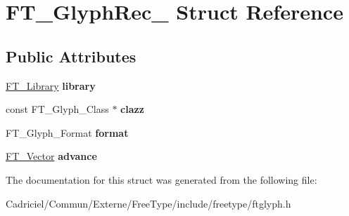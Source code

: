 \hypertarget{struct_f_t___glyph_rec__}{\section{F\-T\-\_\-\-Glyph\-Rec\-\_\- Struct Reference}
\label{struct_f_t___glyph_rec__}
}
\subsection*{Public Attributes}
\begin{DoxyCompactItemize}
\item 
\hypertarget{struct_f_t___glyph_rec___a00679b5e2519affab0f3999718817f8e}{\hyperlink{struct_f_t___library_rec__}{F\-T\-\_\-\-Library} {\bfseries library}}\label{struct_f_t___glyph_rec___a00679b5e2519affab0f3999718817f8e}

\item 
\hypertarget{struct_f_t___glyph_rec___ad7074cfe0e9fd6616e4dc4011e481524}{const F\-T\-\_\-\-Glyph\-\_\-\-Class $\ast$ {\bfseries clazz}}\label{struct_f_t___glyph_rec___ad7074cfe0e9fd6616e4dc4011e481524}

\item 
\hypertarget{struct_f_t___glyph_rec___a26b42a2610a69dcaed3e7c8b6d506211}{F\-T\-\_\-\-Glyph\-\_\-\-Format {\bfseries format}}\label{struct_f_t___glyph_rec___a26b42a2610a69dcaed3e7c8b6d506211}

\item 
\hypertarget{struct_f_t___glyph_rec___afd95b047df6a249db79018a279137018}{\hyperlink{struct_f_t___vector__}{F\-T\-\_\-\-Vector} {\bfseries advance}}\label{struct_f_t___glyph_rec___afd95b047df6a249db79018a279137018}

\end{DoxyCompactItemize}


The documentation for this struct was generated from the following file\-:\begin{DoxyCompactItemize}
\item 
Cadriciel/\-Commun/\-Externe/\-Free\-Type/include/freetype/ftglyph.\-h\end{DoxyCompactItemize}
